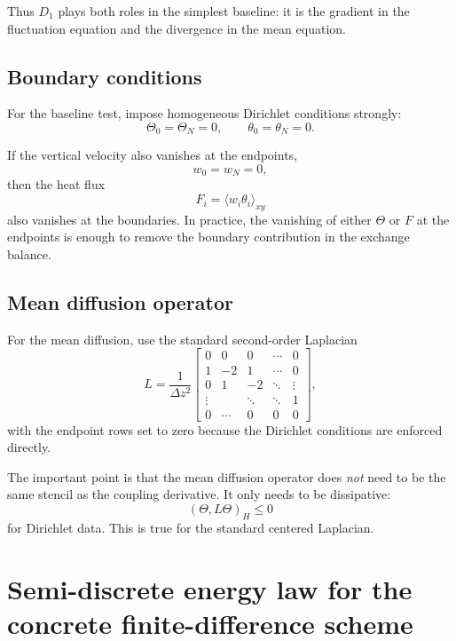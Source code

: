 \documentclass[11pt]{article}
\begin{document}
Thus $D_1$ plays both roles in the simplest baseline: it is the gradient in the fluctuation equation and the divergence in the mean equation.

\subsection{Boundary conditions}

For the baseline test, impose homogeneous Dirichlet conditions strongly:
\begin{equation}
\Theta_0 = \Theta_N = 0,
\qquad
\theta_0 = \theta_N = 0.
\label{eq:dirichlet-bc}
\end{equation}

If the vertical velocity also vanishes at the endpoints,
\[
w_0 = w_N = 0,
\]
then the heat flux
\[
F_i = \langle w_i\theta_i\rangle_{xy}
\]
also vanishes at the boundaries. In practice, the vanishing of either $\Theta$ or $F$ at the endpoints is enough to remove the boundary contribution in the exchange balance.

\subsection{Mean diffusion operator}

For the mean diffusion, use the standard second-order Laplacian
\begin{equation}
L
=
\frac{1}{\Delta z^2}
\begin{bmatrix}
0 & 0 & 0 & \cdots & 0 \\
1 & -2 & 1 & \cdots & 0 \\
0 & 1 & -2 & \ddots & \vdots \\
\vdots & & \ddots & \ddots & 1 \\
0 & \cdots & 0 & 0 & 0
\end{bmatrix},
\label{eq:L-second-order}
\end{equation}
with the endpoint rows set to zero because the Dirichlet conditions are enforced directly.

The important point is that the mean diffusion operator does \emph{not} need to be the same stencil as the coupling derivative. It only needs to be dissipative:
\[
(\Theta,L\Theta)_H \le 0
\]
for Dirichlet data. This is true for the standard centered Laplacian.

\section{Semi-discrete energy law for the concrete finite-difference scheme}
\end{document}
